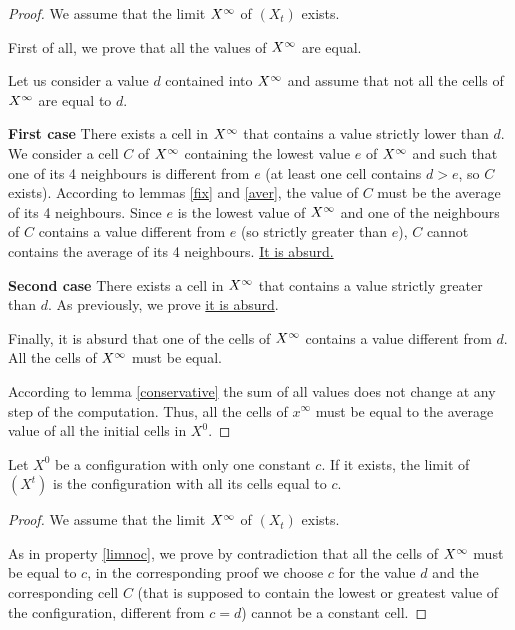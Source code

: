 \begin{proof}
  We assume that the limit $X^{\infty}$ of $(X_t)$ exists.
  
  First of all, we prove that all the values of $X^{\infty}$ are equal. 
  
  Let us consider a value $d$ contained into $X^{\infty}$ and assume that not all the cells of $X^{\infty}$ are equal to $d$.
  
  \textbf{First case} There exists a cell in $X^{\infty}$ that contains a value strictly lower than $d$. We consider a cell $C$ of $X^{\infty}$ containing the lowest value $e$ of $X^{\infty}$ and such that one of its 4 neighbours is different from $e$ (at least one cell contains $d > e$, so $C$ exists). According to lemmas \ref{fix} and \ref{aver}, the value of $C$ must be the average of its 4 neighbours. Since $e$ is the lowest value of $X^{\infty}$ and one of the neighbours of $C$ contains a value different from $e$ (so strictly greater than $e$), $C$ cannot contains the average of its 4 neighbours. \underline{It is absurd.}

  \textbf{Second case} There exists a cell in $X^{\infty}$ that contains a value strictly greater than $d$. As previously, we prove \underline{it is absurd}.
  
  Finally, it is absurd that one of the cells of $X^{\infty}$ contains a value different from $d$. All the cells of $X^{\infty}$ must be equal.
  
  According to lemma \ref{conservative} the sum of all values does not change at any step of the computation. Thus, all the cells of $x^{\infty}$ must be equal to the average value of all the initial cells in $X^0$.  
\end{proof}


\begin{prop}
  \label{twocst}
  Let $X^0$ be a configuration with only one constant $c$. If it exists, the limit of $(X^t)$ is the configuration with all its cells equal to $c$.
\end{prop}

\begin{proof}
  We assume that the limit $X^{\infty}$ of $(X_t)$ exists.
  
  As in property \ref{limnoc}, we prove by contradiction that all the cells of $X^{\infty}$ must be equal to $c$, in the corresponding proof we choose $c$ for the value $d$ and the corresponding cell $C$ (that is supposed to contain the lowest or greatest value of the configuration, different from $c=d$) cannot be a constant cell.
\end{proof}

